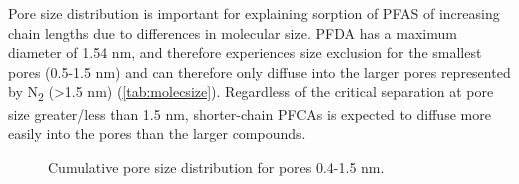 Pore size distribution is important for explaining sorption of PFAS of increasing chain lengths due to differences in molecular size. PFDA has a maximum diameter of 1.54 nm, and therefore experiences size exclusion for the smallest pores (0.5-1.5 nm) and can therefore only diffuse into the larger pores represented by N\textsubscript{2} (\textgreater 1.5 nm) (\cref{tab:molecsize}). Regardless of the critical separation at pore size greater/less than 1.5 nm, shorter-chain PFCAs is expected to diffuse more easily into the pores than the larger compounds.  

\begin{figure}[!ht]
\hfill
{}
\hfill
{}
\caption{Cumulative pore size distribution for pores 0.4-1.5 nm.}
\label{fig:PZD_small}
\end{figure}

